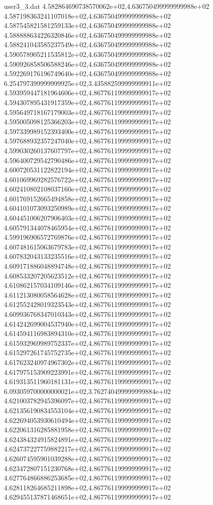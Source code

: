 \begin{filecontents}{user3_3.dat}
4.582864690738570062e+02,4.636750499999999988e+02
4.587198363241107018e+02,4.636750499999999988e+02
4.587545821581259133e+02,4.636750499999999988e+02
4.588888634226320846e+02,4.636750499999999988e+02
4.588241043585237549e+02,4.636750499999999988e+02
4.590578905211535812e+02,4.636750499999999988e+02
4.590926858506588246e+02,4.636750499999999988e+02
4.592269176196749640e+02,4.636750499999999988e+02
6.254797399999999925e+02,3.435882599999999911e+02
4.593959447181964606e+02,4.867761199999999917e+02
4.594307895431917359e+02,4.867761199999999917e+02
4.595649718167179003e+02,4.867761199999999917e+02
4.595005098125366203e+02,4.867761199999999917e+02
4.597339989152393400e+02,4.867761199999999917e+02
4.597688932357247040e+02,4.867761199999999917e+02
4.599030260137607797e+02,4.867761199999999917e+02
4.596400729542790486e+02,4.867761199999999917e+02
4.600720531122822194e+02,4.867761199999999917e+02
4.601069969282576722e+02,4.867761199999999917e+02
4.602410802108037160e+02,4.867761199999999917e+02
4.601769152665494858e+02,4.867761199999999917e+02
4.604101073093250989e+02,4.867761199999999917e+02
4.604451006207906403e+02,4.867761199999999917e+02
4.605791344078465954e+02,4.867761199999999917e+02
4.599196906572769876e+02,4.867761199999999917e+02
4.607481615063679783e+02,4.867761199999999917e+02
4.607832043133235516e+02,4.867761199999999917e+02
4.609171886048894748e+02,4.867761199999999917e+02
4.608533207205623512e+02,4.867761199999999917e+02
4.610862157034109146e+02,4.867761199999999917e+02
4.611213080058564628e+02,4.867761199999999917e+02
4.612552428019323543e+02,4.867761199999999917e+02
4.609936768347010343e+02,4.867761199999999917e+02
4.614242699004537940e+02,4.867761199999999917e+02
4.614594116983894310e+02,4.867761199999999917e+02
4.615932969989752337e+02,4.867761199999999917e+02
4.615297261745752735e+02,4.867761199999999917e+02
4.617623240974967302e+02,4.867761199999999917e+02
4.617975153909223991e+02,4.867761199999999917e+02
4.619313511960181131e+02,4.867761199999999917e+02
6.093059700000000021e+02,3.762740499999999884e+02
4.621003782945396097e+02,4.867761199999999917e+02
4.621356190834553104e+02,4.867761199999999917e+02
4.622694053930610494e+02,4.867761199999999917e+02
4.622061316285881958e+02,4.867761199999999917e+02
4.624384324915824891e+02,4.867761199999999917e+02
4.624737227759882217e+02,4.867761199999999917e+02
4.626074595901039288e+02,4.867761199999999917e+02
4.623472807151230768e+02,4.867761199999999917e+02
4.627764866886253685e+02,4.867761199999999917e+02
4.628118264685211898e+02,4.867761199999999917e+02
4.629455137871468651e+02,4.867761199999999917e+02

\end{filecontents}
